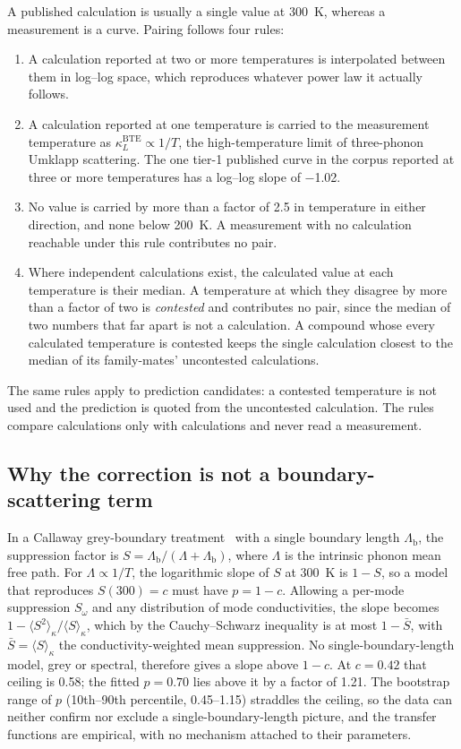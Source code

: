 \documentclass[preprint, 12pt]{elsarticle}
\begin{document}
A published calculation is usually a single value at \SI{300}{\kelvin}, whereas a measurement is a
curve. Pairing follows four rules:
\begin{enumerate}
  \item A calculation reported at two or more temperatures is interpolated between them in log--log
        space, which reproduces whatever power law it actually follows.
  \item A calculation reported at one temperature is carried to the measurement temperature as
        $\kappa_L^{\mathrm{BTE}} \propto 1/T$, the high-temperature limit of three-phonon Umklapp
        scattering. The one tier-1 published curve in the corpus reported at three or more
        temperatures has a log--log slope of \num{-1.02}.
  \item No value is carried by more than a factor of \num{2.5} in temperature in either direction,
        and none below \SI{200}{\kelvin}. A measurement with no calculation reachable under this rule
        contributes no pair.
  \item Where independent calculations exist, the calculated value at each temperature is their
        median. A temperature at which they disagree by more than a factor of two is
        \emph{contested} and contributes no pair, since the median of two numbers that far apart is
        not a calculation. A compound whose every calculated temperature is contested keeps the
        single calculation closest to the median of its family-mates' uncontested calculations.
\end{enumerate}
The same rules apply to prediction candidates: a contested temperature is not used and the
prediction is quoted from the uncontested calculation. The rules compare calculations only with
calculations and never read a measurement.

\subsection*{Why the correction is not a boundary-scattering term}

In a Callaway grey-boundary treatment~\cite{callaway1959model} with a single boundary length
$\Lambda_\mathrm{b}$, the suppression factor is $S = \Lambda_\mathrm{b}/(\Lambda+\Lambda_\mathrm{b})$,
where $\Lambda$ is the intrinsic phonon mean free path. For $\Lambda \propto 1/T$, the logarithmic
slope of $S$ at \SI{300}{\kelvin} is $1-S$, so a model that reproduces $S(300)=c$ must have $p = 1-c$.
Allowing a per-mode suppression $S_\omega$ and any distribution of mode conductivities, the slope
becomes $1 - \langle S^2\rangle_\kappa/\langle S\rangle_\kappa$, which by the Cauchy--Schwarz
inequality is at most $1-\bar S$, with $\bar S = \langle S\rangle_\kappa$ the conductivity-weighted
mean suppression. No single-boundary-length model, grey or spectral, therefore gives a slope above
$1-c$. At $c=\num{0.42}$ that ceiling is \num{0.58}; the fitted $p=\num{0.70}$ lies above it by a
factor of \num{1.21}. The bootstrap range of $p$ (10th--90th percentile, \numrange{0.45}{1.15}) straddles the ceiling, so the
data can neither confirm nor exclude a single-boundary-length picture, and the transfer functions are
empirical, with no mechanism attached to their parameters.
\end{document}
